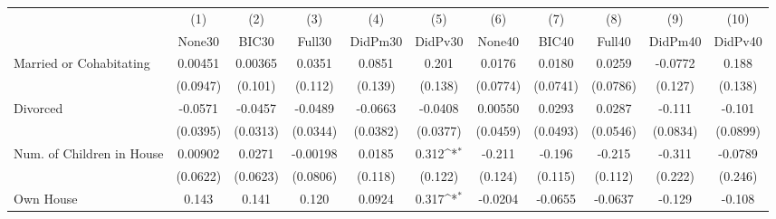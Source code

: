 {
\def\sym#1{\ifmmode^{#1}\else\(^{#1}\)\fi}
\begin{tabular}{l*{10}{c}}
\toprule
            &\multicolumn{1}{c}{(1)}&\multicolumn{1}{c}{(2)}&\multicolumn{1}{c}{(3)}&\multicolumn{1}{c}{(4)}&\multicolumn{1}{c}{(5)}&\multicolumn{1}{c}{(6)}&\multicolumn{1}{c}{(7)}&\multicolumn{1}{c}{(8)}&\multicolumn{1}{c}{(9)}&\multicolumn{1}{c}{(10)}\\
            &\multicolumn{1}{c}{None30}&\multicolumn{1}{c}{BIC30}&\multicolumn{1}{c}{Full30}&\multicolumn{1}{c}{DidPm30}&\multicolumn{1}{c}{DidPv30}&\multicolumn{1}{c}{None40}&\multicolumn{1}{c}{BIC40}&\multicolumn{1}{c}{Full40}&\multicolumn{1}{c}{DidPm40}&\multicolumn{1}{c}{DidPv40}\\
\midrule
Married or Cohabitating&     0.00451         &     0.00365         &      0.0351         &      0.0851         &       0.201         &      0.0176         &      0.0180         &      0.0259         &     -0.0772         &       0.188         \\
            &    (0.0947)         &     (0.101)         &     (0.112)         &     (0.139)         &     (0.138)         &    (0.0774)         &    (0.0741)         &    (0.0786)         &     (0.127)         &     (0.138)         \\
\addlinespace
Divorced    &     -0.0571         &     -0.0457         &     -0.0489         &     -0.0663         &     -0.0408         &     0.00550         &      0.0293         &      0.0287         &      -0.111         &      -0.101         \\
            &    (0.0395)         &    (0.0313)         &    (0.0344)         &    (0.0382)         &    (0.0377)         &    (0.0459)         &    (0.0493)         &    (0.0546)         &    (0.0834)         &    (0.0899)         \\
\addlinespace
Num. of Children in House&     0.00902         &      0.0271         &    -0.00198         &      0.0185         &       0.312\sym{*}  &      -0.211         &      -0.196         &      -0.215         &      -0.311         &     -0.0789         \\
            &    (0.0622)         &    (0.0623)         &    (0.0806)         &     (0.118)         &     (0.122)         &     (0.124)         &     (0.115)         &     (0.112)         &     (0.222)         &     (0.246)         \\
\addlinespace
Own House   &       0.143         &       0.141         &       0.120         &      0.0924         &       0.317\sym{*}  &     -0.0204         &     -0.0655         &     -0.0637         &      -0.129         &      -0.108         \\

\end{tabular}}
